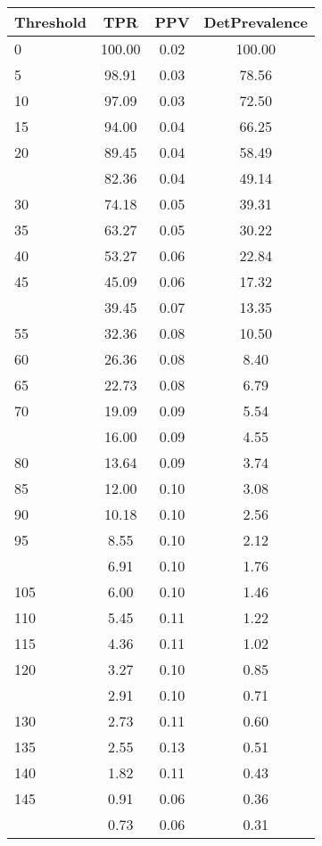 \begin{table}[ht]
\centering
\begin{tabular}{lccc}
  \toprule
Threshold & TPR & PPV & DetPrevalence \\ 
  \midrule
0 & 100.00 & 0.02 & 100.00 \\ 
  5 & 98.91 & 0.03 & 78.56 \\ 
  10 & 97.09 & 0.03 & 72.50 \\ 
  15 & 94.00 & 0.04 & 66.25 \\ 
  20 & 89.45 & 0.04 & 58.49 \\ 
   \addlinespace
25 & 82.36 & 0.04 & 49.14 \\ 
  30 & 74.18 & 0.05 & 39.31 \\ 
  35 & 63.27 & 0.05 & 30.22 \\ 
  40 & 53.27 & 0.06 & 22.84 \\ 
  45 & 45.09 & 0.06 & 17.32 \\ 
   \addlinespace
50 & 39.45 & 0.07 & 13.35 \\ 
  55 & 32.36 & 0.08 & 10.50 \\ 
  60 & 26.36 & 0.08 & 8.40 \\ 
  65 & 22.73 & 0.08 & 6.79 \\ 
  70 & 19.09 & 0.09 & 5.54 \\ 
   \addlinespace
75 & 16.00 & 0.09 & 4.55 \\ 
  80 & 13.64 & 0.09 & 3.74 \\ 
  85 & 12.00 & 0.10 & 3.08 \\ 
  90 & 10.18 & 0.10 & 2.56 \\ 
  95 & 8.55 & 0.10 & 2.12 \\ 
   \addlinespace
100 & 6.91 & 0.10 & 1.76 \\ 
  105 & 6.00 & 0.10 & 1.46 \\ 
  110 & 5.45 & 0.11 & 1.22 \\ 
  115 & 4.36 & 0.11 & 1.02 \\ 
  120 & 3.27 & 0.10 & 0.85 \\ 
   \addlinespace
125 & 2.91 & 0.10 & 0.71 \\ 
  130 & 2.73 & 0.11 & 0.60 \\ 
  135 & 2.55 & 0.13 & 0.51 \\ 
  140 & 1.82 & 0.11 & 0.43 \\ 
  145 & 0.91 & 0.06 & 0.36 \\ 
   \addlinespace
150 & 0.73 & 0.06 & 0.31 \\ 

\end{tabular}
\end{table}
